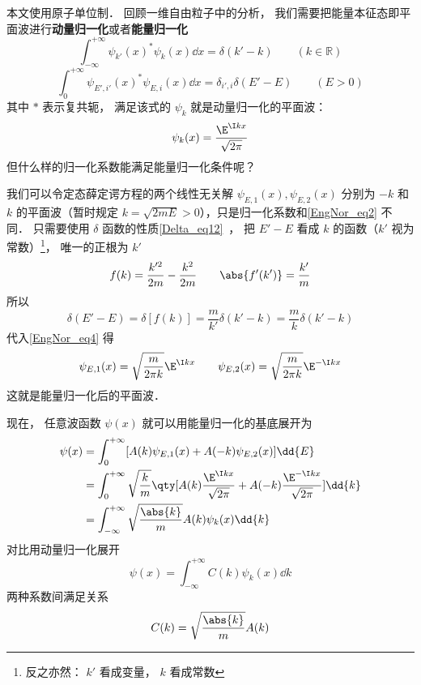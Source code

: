 

本文使用原子单位制． 回顾一维自由粒子中的分析， 我们需要把能量本征态即平面波进行\textbf{动量归一化}或者\textbf{能量归一化}%
\begin{equation}\label{EngNor_eq1}
\int_{-\infty}^{+\infty} \psi_{k'}(x)^* \psi_{k}(x) \dd{x} = \delta(k' - k) \qquad (k \in \mathbb R)
\end{equation}
\begin{equation}\label{EngNor_eq4}
\int_{0}^{+\infty} \psi_{E',i'}(x)^* \psi_{E,i}(x) \dd{x} = \delta_{i',i}\delta(E' - E) \qquad (E > 0)
\end{equation}
其中 $*$ 表示复共轭， 满足该式的 $\psi_k$ 就是动量归一化的平面波：%
\begin{equation}\label{EngNor_eq2}
\psi_k(x) = \frac{\E^{\I kx}}{\sqrt{2\pi}}
\end{equation}
但什么样的归一化系数能满足能量归一化条件呢？

我们可以令定态薛定谔方程的两个线性无关解 $\psi_{E,1}(x), \psi_{E,2}(x)$ 分别为 $-k$ 和 $k$ 的平面波（暂时规定 $k = \sqrt{2mE} > 0$），只是归一化系数和\autoref{EngNor_eq2} 不同． 只需要使用 $\delta$ 函数的性质\autoref{Delta_eq12}~， 把 $E'-E$ 看成 $k$ 的函数（$k'$ 视为常数）\footnote{反之亦然： $k'$ 看成变量， $k$ 看成常数}， 唯一的正根为 $k'$
\begin{equation}
f(k) = \frac{k'^2}{2m} - \frac{k^2}{2m}
\qquad
\abs{f'(k')} = \frac{k'}{m}
\end{equation}
所以
\begin{equation}
\delta(E'-E) = \delta[f(k)] = \frac{m}{k'} \delta(k'-k) = \frac{m}{k} \delta(k'-k)
\end{equation}
代入\autoref{EngNor_eq4} 得
\begin{equation}
\psi_{E,1}(x) = \sqrt{\frac{m}{2\pi k}}\E^{\I kx}
\qquad
\psi_{E,2}(x) = \sqrt{\frac{m}{2\pi k}}\E^{-\I kx}
\end{equation}
这就是能量归一化后的平面波．

现在， 任意波函数 $\psi(x)$ 就可以用能量归一化的基底展开为%
\begin{equation}
\begin{aligned}
\psi(x) &= \int_0^{+\infty} [A(k) \psi_{E,1}(x) + A(-k) \psi_{E,2}(x)] \dd{E}\\
&= \int_0^{+\infty} \sqrt{\frac{k}{m}}\qty[A(k) \frac{\E^{\I kx}}{\sqrt{2\pi}} + A(-k)\frac{\E^{-\I kx}}{\sqrt{2\pi}}]\dd{k}\\
&= \int_{-\infty}^{+\infty} \sqrt{\frac{\abs{k}}{m}}A(k) \psi_k(x) \dd{k}
\end{aligned}
\end{equation}
对比用动量归一化展开
\begin{equation}
\psi(x) = \int_{-\infty}^{+\infty} C(k)\psi_k(x) \dd{k}
\end{equation}
两种系数间满足关系
\begin{equation}
C(k) = \sqrt{\frac{\abs{k}}{m}}A(k)
\end{equation}

